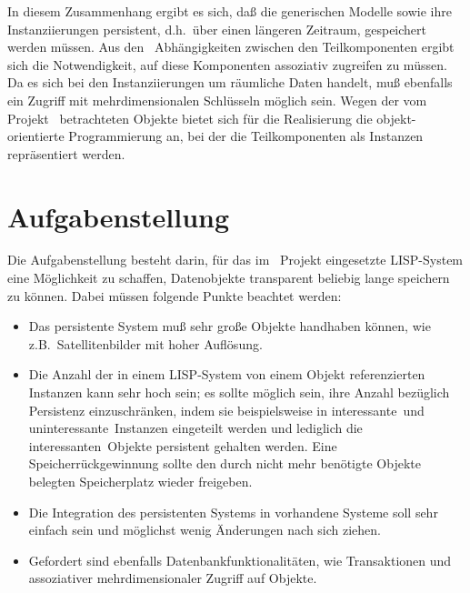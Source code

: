 %
\par{}In diesem Zusammenhang ergibt es sich, da\ss{} die generischen Modelle
sowie ihre Instanziierungen persistent, d.h.\ \"{u}ber einen l\"{a}ngeren
Zeitraum, gespeichert werden m\"{u}ssen. Aus den
\og[en]\ Ab\-h\"{a}n\-gig\-kei\-ten
zwischen den Teilkomponenten ergibt sich die Notwendigkeit, auf diese
Komponenten assoziativ zugreifen zu m\"{u}ssen. Da es sich bei den
Instanziierungen um r\"{a}umliche Daten handelt, mu\ss{} ebenfalls ein
Zugriff mit mehrdimensionalen Schl\"{u}sseln m\"{o}glich sein.
Wegen der vom Projekt \oscar\ betrachteten Objekte bietet sich
f\"{u}r die Realisierung die objekt-orientierte Programmierung an,
bei der die Teilkomponenten als Instanzen repr\"{a}sentiert werden.
%
\section{Aufgabenstellung}%
\label{sec:task}%
%
Die Aufgabenstellung besteht darin, f\"{u}r das im \oscar\ Projekt
eingesetzte LISP-System eine M\"{o}g\-lich\-keit zu schaffen,
Datenobjekte transparent beliebig lange speichern zu k\"{o}nnen. Dabei
m\"{u}ssen folgende Punkte beachtet werden:
\begin{itemize}
%
\item Das persistente System mu\ss{} sehr gro\ss{}e Objekte handhaben k\"{o}nnen,
wie z.B.\ Satellitenbilder mit hoher Aufl\"{o}sung.
%
\item Die Anzahl der in einem LISP-System von einem Objekt
referenzierten Instanzen kann sehr hoch sein; es sollte m\"{o}glich sein,
ihre Anzahl bez\"{u}glich Persistenz einzuschr\"{a}nken, indem sie
beispielsweise in \rglq{}interessante\rgrq\ und
\rglq{}uninteressante\rgrq\ Instanzen eingeteilt werden und lediglich
die \rglq{}interessanten\rgrq\ Objekte persistent gehalten werden.  Eine
Spei\-cher\-r\"{u}ck\-ge\-win\-nung sollte den durch nicht mehr
ben\"{o}tigte Objekte belegten Speicherplatz wieder freigeben.
%
\item Die Integration des persistenten Systems in vorhandene Systeme
soll sehr einfach sein und m\"{o}glichst wenig \"{A}nderungen nach sich
ziehen.
%
\item Gefordert sind ebenfalls Datenbankfunktionalit\"{a}ten, wie
Transaktionen und assoziativer mehrdimensionaler Zugriff auf Objekte.
%
\end{itemize}
%
